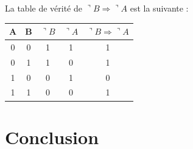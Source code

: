 \documentclass[a4]{article}
\begin{document}
La table de vérité de $\urcorner B \Rightarrow \urcorner A$ est la suivante :\\

\begin{tabular}[h]{|c|c||c|c||c|}
\hline
A & B & $\urcorner B$ & $\urcorner A$ & $\urcorner B \Rightarrow \urcorner A$ \\
\hline
0 & 0 & 1 & 1 & 1\\
\hline
0 & 1 & 1 & 0 & 1\\
\hline
1 & 0 & 0 & 1 & 0\\
\hline
1 & 1 & 0 & 0 & 1\\
\hline
\end{tabular}

\section{Conclusion}
\end{document}
